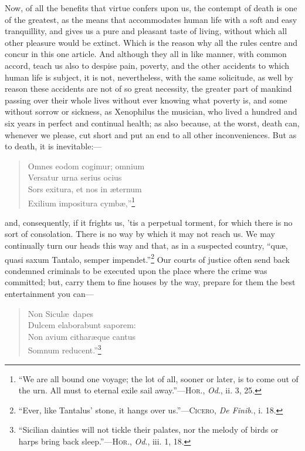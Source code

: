 Now, of all the benefits that virtue confers upon us, the contempt of
death is one of the greatest, as the means that accommodates human
life with a soft and easy tranquillity, and gives us a pure and
pleasant taste of living, without which all other pleasure would be
extinct. Which is the reason why all the rules centre and concur in
this one article. And although they all in like manner, with common
accord, teach us also to despise pain, poverty, and the other
accidents to which human life is subject, it is not, nevertheless,
with the same solicitude, as well by reason these accidents are not of
so great necessity, the greater part of mankind passing over their
whole lives without ever knowing what poverty is, and some without
sorrow or sickness, as Xenophilus the musician, who lived a hundred
and six years in perfect and continual health; as also because, at the
worst, death can, whenever we please, cut short and put an end to all
other inconveniences. But as to death, it is inevitable:---

\begin{verse}
Omnes eodom cogimur; omnium\\
Versatur urna serius ocius\\
Sors exitura, et nos in \ae ternum\\
Exilium impositura cymb\ae,''\footnote{``We are all bound one voyage;
the lot of all, sooner or later, is to come out of the urn. All must
to eternal exile sail away.''---\textsc{Hor}., \textit{Od}., ii. 3,
25.}
\end{verse}

\noindent and, consequently, if it frights us, 'tis a perpetual
torment, for which there is no sort of consolation. There is no way by
which it may not reach us. We may continually turn our heads this way
and that, as in a suspected country, ``qu\ae, quasi saxum Tantalo,
semper impendet.''\footnote{``Ever, like Tantalus' stone, it hangs
over us.''---\textsc{Cicero}, \textit{De Finib}., i. 18.} Our courts
of justice often send back condemned criminals to be executed upon the
place where the crime was committed; but, carry them to fine houses by
the way, prepare for them the best entertainment you can---

\begin{verse}
\vin\vin\vin {}Non Sicul\ae\ dapes\\
Dulcem elaborabunt saporem:\\
\vin Non avium cithar\ae que cantus\\
\vin\vin Somnum reducent.''\footnote{``Sicilian dainties will not
tickle their palates, nor the melody of birds or harps bring back
sleep.''---\textsc{Hor}., \textit{Od}., iii. 1, 18.}
\end{verse}

